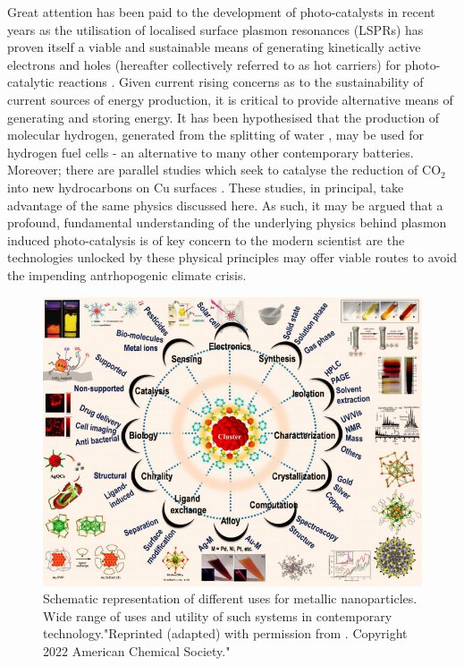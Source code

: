 Great attention has been paid to the development of photo-catalysts in recent years as the utilisation of localised surface plasmon resonances (LSPRs) has proven itself a viable and sustainable means of generating kinetically active electrons and holes (hereafter collectively referred to as hot carriers) for photo-catalytic reactions \cite{HotCarrierCreation_Structure,AuPlasmonRev,BioSensors,ExtractHotCars}. Given current rising concerns as to the sustainability of current sources of energy production, it is critical to provide alternative means of generating and storing energy. It has been hypothesised that the production of molecular hydrogen, generated from the splitting of water \cite{H2Dissociate,MoreH2Dissociate}, may be used for hydrogen fuel cells - an alternative to many other contemporary batteries. Moreover; there are parallel studies which seek to catalyse the reduction of CO$_{2}$ into new hydrocarbons on Cu surfaces \cite{LSPCatalysis}. These studies, in principal, take advantage of the same physics discussed here. As such, it may be argued that a profound, fundamental understanding of the underlying physics behind plasmon induced photo-catalysis is of key concern to the modern scientist are the technologies unlocked by these physical principles may offer viable routes to avoid the impending antrhopogenic climate crisis.
%
\begin{figure}[ht]
    \centering
            \includegraphics[width=.95\linewidth]{figures/Uses.png}\hfill
            \caption{Schematic representation of different uses for metallic nanoparticles. Wide range of uses and utility of such systems in contemporary technology."Reprinted (adapted) with permission from \cite{BigMNPDiagram}. Copyright 2022 American Chemical Society."}
            \label{Uses}
\end{figure}
%


